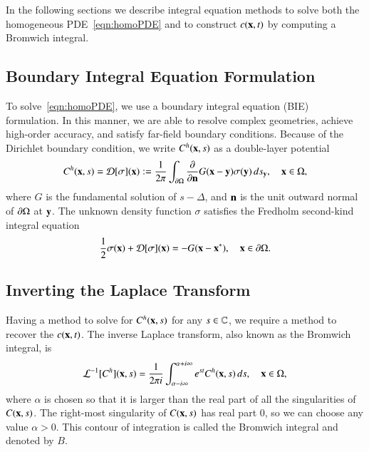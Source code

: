 \documentclass[preprint, 10pt]{elsarticle}
\begin{document}
In the following sections we describe integral equation methods to solve
both the homogeneous PDE~\eqref{eqn:homoPDE} and to construct $c({\mathbf{x}},t)$
by computing a Bromwich integral.


\subsection{Boundary Integral Equation Formulation} 
\label{sec:bies}
To solve~\eqref{eqn:homoPDE}, we use a boundary integral equation (BIE)
formulation. In this manner, we are able to resolve complex geometries,
achieve high-order accuracy, and satisfy far-field boundary conditions.
Because of the Dirichlet boundary condition, we write $C^{h}({\mathbf{x}},s)$ as
a double-layer potential 
\begin{align}
  \label{eqn:DLP}
  C^{h}({\mathbf{x}},s) = {\mathcal{D}}[\sigma]({\mathbf{x}}) := 
    \frac{1}{2\pi} \int_{{\partial} \Omega} \frac{\partial }{\partial {\mathbf{n}}}
    G({\mathbf{x}} - {\mathbf{y}}) \sigma({\mathbf{y}})\, ds_{\mathbf{y}}, \quad {\mathbf{x}} \in \Omega,
\end{align}
where $G$ is the fundamental solution of $s - \Delta$, and ${\mathbf{n}}$ is the
unit outward normal of ${\partial}\Omega$ at ${\mathbf{y}}$. The unknown density
function $\sigma$ satisfies the Fredholm second-kind integral equation
\begin{align}
  \label{eqn:BIE}
  \frac{1}{2} \sigma({\mathbf{x}}) + {\mathcal{D}}[\sigma]({\mathbf{x}}) = -G({\mathbf{x}} - {\mathbf{x}}^*),
    \quad {\mathbf{x}} \in {\partial}\Omega.
\end{align}

\subsection{Inverting the Laplace Transform}
\label{sec:bromwich}
Having a method to solve for $C^h({\mathbf{x}},s)$ for any $s \in {\mathbb{C}}$, we
require a method to recover the $c({\mathbf{x}},t)$. The inverse Laplace
transform, also known as the Bromwich integral, is
\begin{align*}
  \mathcal{L}^{-1}[C^h]({\mathbf{x}},s) = \frac{1}{2\pi i} 
    \int_{\alpha - i\infty} ^{\alpha + i\infty} 
    e^{st} C^h({\mathbf{x}},s)\, ds, \quad {\mathbf{x}} \in \Omega,
\end{align*}
where $\alpha$ is chosen so that it is larger than the real part of
all the singularities of $C({\mathbf{x}},s)$. The right-most singularity of
$C({\mathbf{x}},s)$ has real part 0, so we can choose any value $\alpha > 0$.
This contour of integration is called the Bromwich integral and denoted
by $B$.
\end{document}
